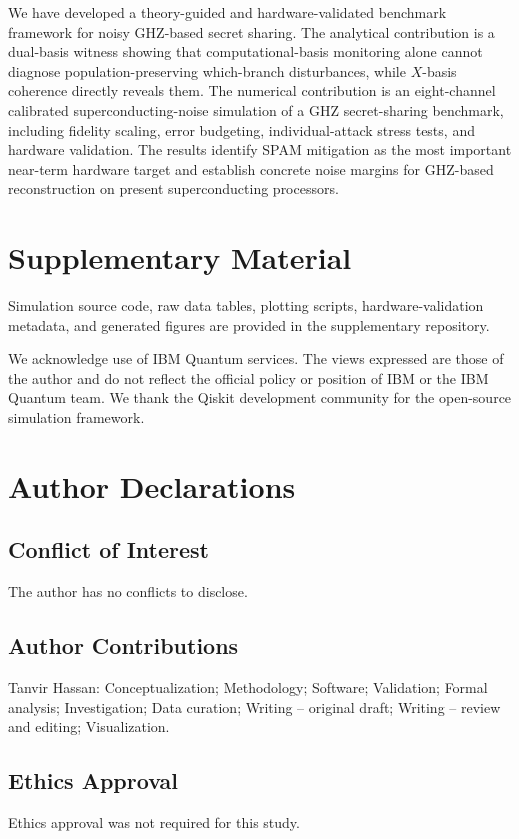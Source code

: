 \documentclass[aip,amsmath,amssymb,reprint,longbibliography]{revtex4-2}
\begin{document}
We have developed a theory-guided and hardware-validated benchmark framework for noisy GHZ-based secret sharing.  The analytical contribution is a dual-basis witness showing that computational-basis monitoring alone cannot diagnose population-preserving which-branch disturbances, while $X$-basis coherence directly reveals them.  The numerical contribution is an eight-channel calibrated superconducting-noise simulation of a GHZ secret-sharing benchmark, including fidelity scaling, error budgeting, individual-attack stress tests, and hardware validation.  The results identify SPAM mitigation as the most important near-term hardware target and establish concrete noise margins for GHZ-based reconstruction on present superconducting processors.

\section*{Supplementary Material}
Simulation source code, raw data tables, plotting scripts, hardware-validation metadata, and generated figures are provided in the supplementary repository.

\begin{acknowledgments}
We acknowledge use of IBM Quantum services.  The views expressed are those of the author and do not reflect the official policy or position of IBM or the IBM Quantum team.  We thank the Qiskit development community for the open-source simulation framework.
\end{acknowledgments}

\section*{Author Declarations}

\subsection*{Conflict of Interest}
The author has no conflicts to disclose.

\subsection*{Author Contributions}
Tanvir Hassan: Conceptualization; Methodology; Software; Validation; Formal analysis; Investigation; Data curation; Writing -- original draft; Writing -- review and editing; Visualization.

\subsection*{Ethics Approval}
Ethics approval was not required for this study.
\end{document}
